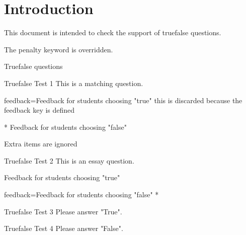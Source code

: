 \documentclass{article}
\begin{document}
\section*{Introduction}

This document is intended to check the support of truefalse questions.

The penalty keyword is overridden.

\begin{quiz}[points=3]{Truefalse questions}

\begin{truefalse}[feedback={general feedback},penalty=3]{Truefalse Test 1}
This is a matching question.
\item[feedback={Feedback for students choosing "true"}] this is discarded 
because the feedback key is defined
\item[]* Feedback for students choosing "false"
\item* Extra items are ignored
\end{truefalse}

\begin{truefalse}[feedback={general feedback}]{Truefalse Test 2}
This is an essay question.
\item Feedback for students choosing "true"
\item[feedback={Feedback for students choosing "false"}]*
\end{truefalse}

\begin{truefalse}[feedback={general feedback}]{Truefalse Test 3}
Please answer "True".
\item*
\end{truefalse}

\begin{truefalse}[feedback={general feedback}]{Truefalse Test 4}
Please answer "False".
\item %
\item*
\end{truefalse}

\end{quiz}
\end{document}
